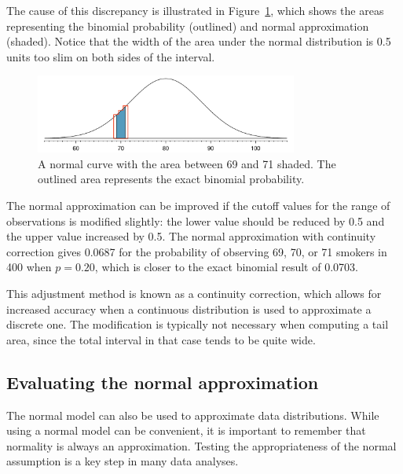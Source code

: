 The cause of this discrepancy is illustrated in Figure~\ref{normApproxToBinomFail}, which shows the areas representing the binomial probability (outlined) and normal approximation (shaded). Notice that the width of the area under the normal distribution is 0.5 units too slim on both sides of the interval.
	
\begin{figure}[h]
		\centering
		\includegraphics[width=0.77\textwidth]{ch_distributions_oi_biostat/figures/normApproxToBinomFail/normApproxToBinomFail}
		\caption{A normal curve with the area between 69 and 71 shaded. The outlined area represents the exact binomial probability.}
		\label{normApproxToBinomFail}
\end{figure}
	
The normal approximation can be improved if the cutoff values for the range of observations is modified slightly: the lower value should be reduced by 0.5 and the upper value increased by 0.5. The normal approximation with continuity correction gives 0.0687 for the probability of observing 69, 70, or 71 smokers in 400 when $p = 0.20$, which is closer to the exact binomial result of 0.0703. 

This adjustment method is known as a continuity correction, which allows for increased accuracy when a continuous distribution is used to approximate a discrete one. The modification is typically not necessary when computing a tail area, since the total interval in that case tends to be quite wide.
	


\subsection{Evaluating the normal approximation}
\label{assessingNormal}

The normal model can also be used to approximate data distributions. While using a normal model can be convenient, it is important to remember that normality is always an approximation. Testing the appropriateness of the normal assumption is a key step in many data analyses.

